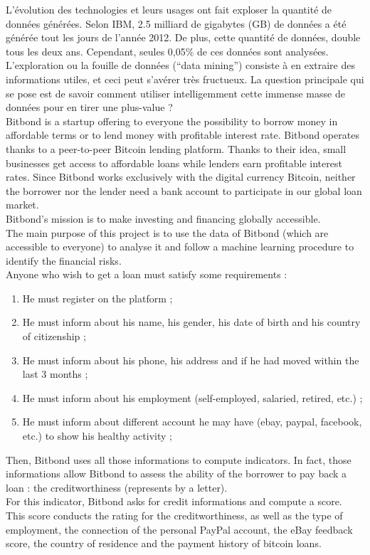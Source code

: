 L’évolution des technologies et leurs usages ont fait exploser la quantité de données générées. Selon IBM, 2.5 milliard de gigabytes (GB) de données a été générée tout les jours de l'année 2012. De plus, cette quantité de données, double tous les deux ans. Cependant, seules 0,05\% de ces données sont analysées.\\

L’exploration ou la fouille de données (``data mining'') consiste à en extraire des informations utiles, et ceci peut s’avérer très fructueux. La question principale qui se pose est de savoir comment utiliser intelligemment cette immense masse de données pour en tirer une plus-value ?\\


Bitbond is a startup offering to everyone the possibility to borrow money in affordable terms or to lend money with profitable interest rate. Bitbond operates thanks to a peer-to-peer Bitcoin lending platform. Thanks to their idea, small businesses get access to affordable loans while lenders earn profitable interest rates. Since Bitbond works exclusively with the digital currency Bitcoin, neither the borrower nor the lender need a bank account to participate in our global loan market.\\
Bitbond's mission is to make investing and financing globally accessible.\\

The main purpose of this project is to use the data of Bitbond (which are accessible to everyone) to analyse it and follow a machine learning procedure to identify the financial risks.\\

Anyone who wish to get a loan must satisfy some requirements :
\begin{enumerate}
    \item He must register on the platform ;
    \item He must inform about his name, his gender, his date of birth and his country of citizenship ;
    \item He must inform about his phone, his address and if he had moved within the last 3 months ;
    \item He must inform about his employment (self-employed, salaried, retired, etc.) ;
    \item He must inform about different account he may have (ebay, paypal, facebook, etc.) to show his healthy activity ;
\end{enumerate}
Then, Bitbond uses all those informations to compute indicators. In fact, those informations allow Bitbond to assess the ability of the borrower to pay back a loan : the creditworthiness (represents by a letter).\\
For this indicator, Bitbond asks for credit informations and compute a score. This score conducts the rating for the creditworthiness, as well as the type of employment, the connection of the personal PayPal account, the eBay feedback score, the country of residence and the payment history of bitcoin loans.\\
